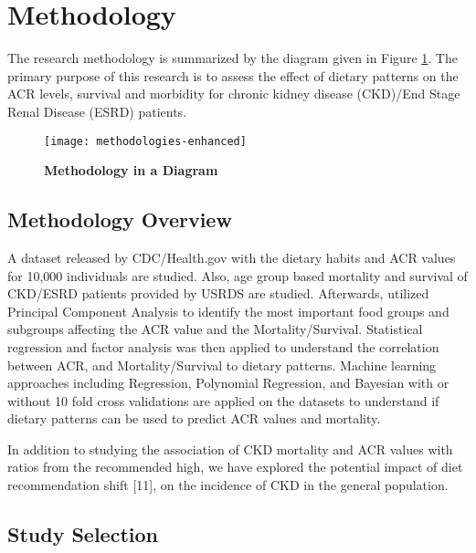 \section{Methodology}
The research methodology is summarized by the diagram given in Figure \ref{methodology-new}. The primary purpose of this research is to assess the  effect of dietary patterns on the ACR levels, survival and morbidity for chronic kidney disease (CKD)/End Stage Renal Disease (ESRD) patients.

\begin{figure}
\centering
\texttt{[image: methodologies-enhanced]}
\caption{\textbf{Methodology in a Diagram}}
\label{methodology-new}
\end{figure}

\subsection{Methodology Overview}
\noindent  A dataset released by CDC/Health.gov with the dietary habits and ACR values for 10,000 individuals are studied. Also, age group based mortality and survival of CKD/ESRD patients provided by USRDS are studied. Afterwards, utilized Principal Component Analysis to identify the most important food groups and subgroups affecting the ACR value and the Mortality/Survival.  Statistical regression and factor analysis was then applied to understand the correlation between ACR, and Mortality/Survival to dietary patterns. Machine learning approaches including Regression, Polynomial Regression, and Bayesian with or without 10 fold cross validations are applied on the datasets to understand if dietary patterns can be used to predict ACR values and mortality. 

\noindent 
In addition to studying the association of CKD mortality and ACR values with ratios from the recommended high, we have explored the potential impact of diet recommendation shift [11], on the incidence of CKD in the general population.

\subsection{Study Selection}

\medskip 

